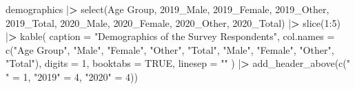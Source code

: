\documentclass[
]{article}
\newenvironment{Shaded}{\begin{snugshade}}{\end{snugshade}}
\newcommand{\AttributeTok}[1]{\textcolor[rgb]{0.77,0.63,0.00}{#1}}
\newcommand{\ConstantTok}[1]{\textcolor[rgb]{0.00,0.00,0.00}{#1}}
\newcommand{\DecValTok}[1]{\textcolor[rgb]{0.00,0.00,0.81}{#1}}
\newcommand{\ErrorTok}[1]{\textcolor[rgb]{0.64,0.00,0.00}{\textbf{#1}}}
\newcommand{\FunctionTok}[1]{\textcolor[rgb]{0.00,0.00,0.00}{#1}}
\newcommand{\NormalTok}[1]{#1}
\newcommand{\OtherTok}[1]{\textcolor[rgb]{0.56,0.35,0.01}{#1}}
\newcommand{\SpecialCharTok}[1]{\textcolor[rgb]{0.00,0.00,0.00}{#1}}
\newcommand{\StringTok}[1]{\textcolor[rgb]{0.31,0.60,0.02}{#1}}
\begin{document}
\begin{Shaded}
\begin{Highlighting}[]
\NormalTok{demographics }\SpecialCharTok{|}\ErrorTok{\textgreater{}}
  \FunctionTok{select}\NormalTok{(}\StringTok{\textasciigrave{}}\AttributeTok{Age Group}\StringTok{\textasciigrave{}}\NormalTok{, }\StringTok{\textasciigrave{}}\AttributeTok{2019\_Male}\StringTok{\textasciigrave{}}\NormalTok{, }\StringTok{\textasciigrave{}}\AttributeTok{2019\_Female}\StringTok{\textasciigrave{}}\NormalTok{,  }\StringTok{\textasciigrave{}}\AttributeTok{2019\_Other}\StringTok{\textasciigrave{}}\NormalTok{, }\StringTok{\textasciigrave{}}\AttributeTok{2019\_Total}\StringTok{\textasciigrave{}}\NormalTok{, }\StringTok{\textasciigrave{}}\AttributeTok{2020\_Male}\StringTok{\textasciigrave{}}\NormalTok{, }\StringTok{\textasciigrave{}}\AttributeTok{2020\_Female}\StringTok{\textasciigrave{}}\NormalTok{, }\StringTok{\textasciigrave{}}\AttributeTok{2020\_Other}\StringTok{\textasciigrave{}}\NormalTok{, }\StringTok{\textasciigrave{}}\AttributeTok{2020\_Total}\StringTok{\textasciigrave{}}\NormalTok{) }\SpecialCharTok{|}\ErrorTok{\textgreater{}}
  \FunctionTok{slice}\NormalTok{(}\DecValTok{1}\SpecialCharTok{:}\DecValTok{5}\NormalTok{) }\SpecialCharTok{|}\ErrorTok{\textgreater{}}
  \FunctionTok{kable}\NormalTok{(}
    \AttributeTok{caption =} \StringTok{"Demographics of the Survey Respondents"}\NormalTok{, }
    \AttributeTok{col.names =} \FunctionTok{c}\NormalTok{(}\StringTok{"Age Group"}\NormalTok{, }\StringTok{"Male"}\NormalTok{, }\StringTok{"Female"}\NormalTok{, }\StringTok{"Other"}\NormalTok{, }\StringTok{"Total"}\NormalTok{, }\StringTok{"Male"}\NormalTok{, }\StringTok{"Female"}\NormalTok{, }\StringTok{"Other"}\NormalTok{, }\StringTok{"Total"}\NormalTok{),}
    \AttributeTok{digits =} \DecValTok{1}\NormalTok{,}
    \AttributeTok{booktabs =} \ConstantTok{TRUE}\NormalTok{, }
    \AttributeTok{linesep =} \StringTok{""}
\NormalTok{  ) }\SpecialCharTok{|}\ErrorTok{\textgreater{}}  
  \FunctionTok{add\_header\_above}\NormalTok{(}\FunctionTok{c}\NormalTok{(}\StringTok{" "} \OtherTok{=} \DecValTok{1}\NormalTok{, }\StringTok{"2019"} \OtherTok{=} \DecValTok{4}\NormalTok{, }\StringTok{"2020"} \OtherTok{=} \DecValTok{4}\NormalTok{))}
\end{Highlighting}
\end{Shaded}
\end{document}
